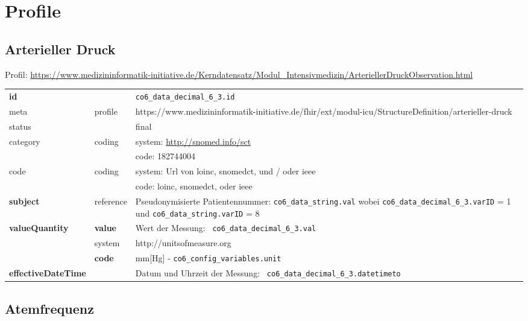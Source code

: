 \section{Profile} \label{sec:profil}

\subsection{Arterieller Druck} 

Profil: \url{https://www.medizininformatik-initiative.de/Kerndatensatz/Modul_Intensivmedizin/ArteriellerDruckObservation.html}

\begin{longtable}{|l|l|p{7.5cm}|}
        \hline
        \rowcolor{lightgray} \multicolumn{3}{|l|}{Data Mapping (inhaltlich)} \\ \hline
        \textbf{id} &  & \texttt{co6\_data\_decimal\_6\_3.id} \\ \hline
	meta & profile & https://www.medizininformatik-initiative.de/fhir/ext/modul-icu/StructureDefinition/arterieller-druck \\ \hline 
	status &  & final   \\ \hline 
	category & coding & system: \url{http://snomed.info/sct} \\
\cline{3-3}
	& & code: 182744004 \\ \hline
	code & coding & system: Url von \ac{loinc}, \ac{snomedct}, und / oder \ac{ieee} \\ 
	\cline{3-3} 
	 &  & code: \ac{loinc}, \ac{snomedct}, oder \ac{ieee} \\ \hline
	 \textbf{subject} & reference & Pseudonymisierte Patientennummer: \texttt{co6\_data\_string.val} wobei \texttt{co6\_data\_decimal\_6\_3.varID} = 1 und \texttt{co6\_data\_string.varID} = 8 \\ \hline
	 \textbf{valueQuantity}  & \textbf{value} & Wert der Messung: \texttt{
co6\_data\_decimal\_6\_3.val} \\
        \cline{2-3}
         & system & http://unitsofmeasure.org \\
         \cline{2-3}
         & \textbf{code} &
mm[Hg] - \texttt{co6\_config\_variables.unit}
\\ \hline
     \textbf{effectiveDateTime}  &  & Datum und Uhrzeit der Messung: \texttt{
co6\_data\_decimal\_6\_3.datetimeto} \\ \hline
\end{longtable}

\subsection{Atemfrequenz} 

